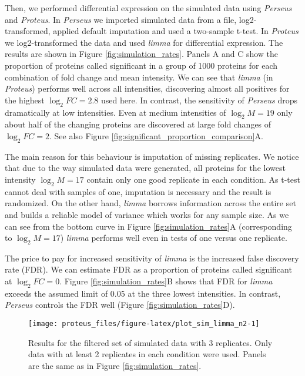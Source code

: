 \documentclass[]{article}
\begin{document}
Then, we performed differential expression on the simulated data using
\emph{Perseus} and \emph{Proteus}. In \emph{Perseus} we imported
simulated data from a file, log2-transformed, applied default imputation
and used a two-sample t-test. In \emph{Proteus} we log2-transformed the
data and used \emph{limma} for differential expression. The results are
shown in Figure \ref{fig:simulation_rates}. Panels A and C show the
proportion of proteins called significant in a group of 1000 proteins
for each combination of fold change and mean intensity. We can see that
\emph{limma} (in \emph{Proteus}) performs well across all intensities,
discovering almost all positives for the highest \(\log_2 FC = 2.8\)
used here. In contrast, the sensitivity of \emph{Perseus} drops
dramatically at low intensities. Even at medium intensities of
\(\log_2 M = 19\) only about half of the changing proteins are
discovered at large fold changes of \(\log_2 FC = 2\). See also Figure
\ref{fig:significant_proportion_comparison}A.

The main reason for this behaviour is imputation of missing replicates.
We notice that due to the way simulated data were generated, all
proteins for the lowest intensity \(\log_2 M = 17\) contain only one
good replicate in each condition. As t-test cannot deal with samples of
one, imputation is necessary and the result is randomized. On the other
hand, \emph{limma} borrows information across the entire set and builds
a reliable model of variance which works for any sample size. As we can
see from the bottom curve in Figure \ref{fig:simulation_rates}A
(corresponding to \(\log_2 M = 17\)) \emph{limma} performs well even in
tests of one versus one replicate.

The price to pay for increased sensitivity of \emph{limma} is the
increased false discovery rate (FDR). We can estimate FDR as a
proportion of proteins called significant at \(\log_2 FC = 0\). Figure
\ref{fig:simulation_rates}B shows that FDR for \emph{limma} exceeds the
assumed limit of 0.05 at the three lowest intensities. In contrast,
\emph{Perseus} controls the FDR well (Figure
\ref{fig:simulation_rates}D).

\begin{figure}[H]

{\centering \texttt{[image: proteus\_files/figure-latex/plot\_sim\_limma\_n2-1]} 

}

\caption{\label{fig:simulation_filt_rates}Results for the filtered set of simulated data with 3 replicates. Only data with at least 2 replicates in each condition were used. Panels are the same as in Figure \ref{fig:simulation_rates}.}\label{fig:plot_sim_limma_n2}
\end{figure}
\end{document}
